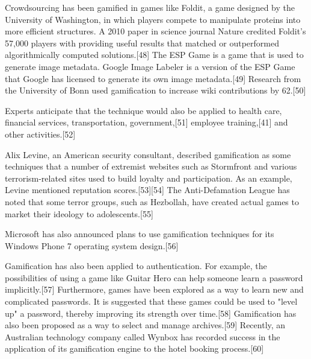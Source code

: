 Crowdsourcing has been gamified in games like Foldit, a game designed by the University of Washington, in which players compete to manipulate proteins into more efficient structures. A 2010 paper in science journal Nature credited Foldit's 57,000 players with providing useful results that matched or outperformed algorithmically computed solutions.[48] The ESP Game is a game that is used to generate image metadata. Google Image Labeler is a version of the ESP Game that Google has licensed to generate its own image metadata.[49] Research from the University of Bonn used gamification to increase wiki contributions by 62.[50]

Experts anticipate that the technique would also be applied to health care, financial services, transportation, government,[51] employee training,[41] and other activities.[52]

Alix Levine, an American security consultant, described gamification as some techniques that a number of extremist websites such as Stormfront and various terrorism-related sites used to build loyalty and participation. As an example, Levine mentioned reputation scores.[53][54] The Anti-Defamation League has noted that some terror groups, such as Hezbollah, have created actual games to market their ideology to adolescents.[55]

Microsoft has also announced plans to use gamification techniques for its Windows Phone 7 operating system design.[56]

Gamification has also been applied to authentication. For example, the possibilities of using a game like Guitar Hero can help someone learn a password implicitly.[57] Furthermore, games have been explored as a way to learn new and complicated passwords. It is suggested that these games could be used to "level up" a password, thereby improving its strength over time.[58] Gamification has also been proposed as a way to select and manage archives.[59] Recently, an Australian technology company called Wynbox has recorded success in the application of its gamification engine to the hotel booking process.[60]




